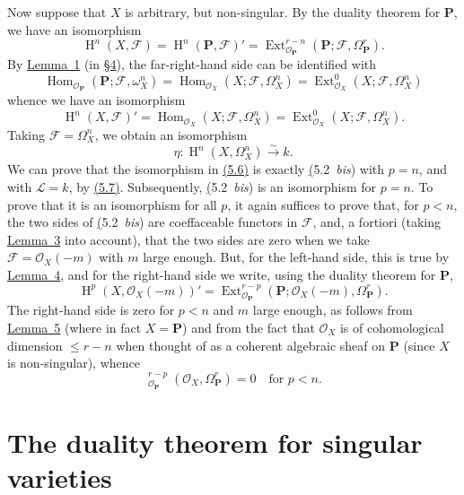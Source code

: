 \documentclass{article}
\theoremstyle{plain}
\theoremstyle{definition}
\newcommand{\scr}[1]{{\mathscr{#1}}}
\newcommand{\bb}{\mathbf}
\renewcommand{\leq}{\leqslant}
\DeclareMathOperator{\Ext}{Ext}
\DeclareMathOperator{\Hom}{Hom}
\DeclareMathOperator{\shExt}{\underline{Ext}}
\DeclareMathOperator{\HH}{H}
\newcommand{\oldpage}[1]{\marginpar{\footnotesize$\Big\vert$ \textit{p.~#1}}}
\begin{document}
Now suppose that $X$ is arbitrary, but non-singular.
By the duality theorem for $\bb{P}$, we have an isomorphism
\[
  \HH^n(X,\scr{F})
  = \HH^n(\bb{P},\scr{F})'
  = \Ext_{\scr{O}_\bb{P}}^{r-n}(\bb{P};\scr{F},\Omega_\bb{P}^r).
\]
By \hyperref[lemma1]{Lemma~1} (in \hyperref[section4]{\S4}), the far-right-hand side can be identified with
\[
  \Hom_{\scr{O}_\bb{P}}(\bb{P};\scr{F},\omega_X^n)
  = \Hom_{\scr{O}_X}(X;\scr{F},\Omega_X^n)
  = \Ext_{\scr{O}_X}^0(X;\scr{F},\Omega_X^n)
\]
whence we have an isomorphism
\[
\label{5.6}
  \HH^n(X,\scr{F})'
  = \Hom_{\scr{O}_X}(X;\scr{F},\Omega_X^n)
  = \Ext_{\scr{O}_X}^0(X;\scr{F},\Omega_X^n).
\tag{5.6}
\]
Taking $\scr{F}=\Omega_X^n$, we obtain an isomorphism
\[
\label{5.7}
  \eta\colon \HH^n(X,\Omega_X^n) \xrightarrow{\sim} k.
\tag{5.7}
\]
\oldpage{149-17}
We can prove that the isomorphism in \hyperref[5.6]{(5.6)} is exactly \hyperref[5.2bis](5.2~\emph{bis}) with $p=n$, and with $\scr{L}=k$, by \hyperref[5.7]{(5.7)}.
Subsequently, \hyperref[5.2bis](5.2~\emph{bis}) is an isomorphism for $p=n$.
To prove that it is an isomorphism for all $p$, it again suffices to prove that, for $p<n$, the two sides of \hyperref[5.2bis](5.2~\emph{bis}) are coeffaceable functors in $\scr{F}$, and, a fortiori (taking \hyperref[lemma3]{Lemma~3} into account), that the two sides are zero when we take $\scr{F}=\scr{O}_X(-m)$ with $m$ large enough.
But, for the left-hand side, this is true by \hyperref[lemma4]{Lemma~4}, and for the right-hand side we write, using the duality theorem for $\bb{P}$,
\[
  \HH^p(X,\scr{O}_X(-m))'
  = \Ext_{\scr{O}_\bb{P}}^{r-p}(\bb{P};\scr{O}_X(-m),\Omega_\bb{P}^r).
\]
The right-hand side is zero for $p<n$ and $m$ large enough, as follows from \hyperref[lemma5]{Lemma~5} (where in fact $X=\bb{P}$) and from the fact that $\scr{O}_X$ is of cohomological dimension $\leq r-n$ when thought of as a coherent algebraic sheaf on $\bb{P}$ (since $X$ is non-singular), whence
\[
  \shExt_{\scr{O}_\bb{P}}^{r-p}(\scr{O}_X,\Omega_\bb{P}^r) = 0
  \quad\mbox{for $p<n$.}
\]


\section{The duality theorem for singular varieties}
\label{section6}
\end{document}
